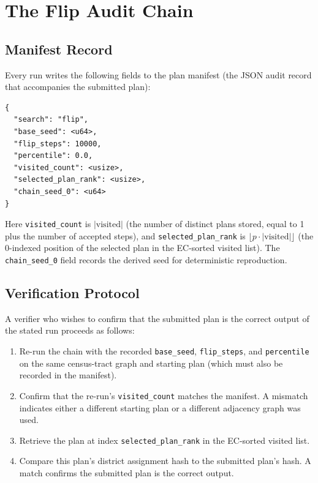 \section{The Flip Audit Chain}
\label{sec:audit}

\subsection{Manifest Record}

Every \flip{} run writes the following fields to the plan manifest (the
JSON audit record that accompanies the submitted plan):

\begin{verbatim}
{
  "search": "flip",
  "base_seed": <u64>,
  "flip_steps": 10000,
  "percentile": 0.0,
  "visited_count": <usize>,
  "selected_plan_rank": <usize>,
  "chain_seed_0": <u64>
}
\end{verbatim}

Here \texttt{visited\_count} is $|\mathrm{visited}|$ (the number of distinct
plans stored, equal to 1 plus the number of accepted steps), and
\texttt{selected\_plan\_rank} is $\lfloor p \cdot |\mathrm{visited}| \rfloor$
(the 0-indexed position of the selected plan in the EC-sorted visited list).
The \texttt{chain\_seed\_0} field records the derived seed for deterministic
reproduction.

\subsection{Verification Protocol}

A verifier who wishes to confirm that the submitted plan is the correct
output of the stated \flip{} run proceeds as follows:

\begin{enumerate}
  \item Re-run the \flip{} chain with the recorded \texttt{base\_seed},
        \texttt{flip\_steps}, and \texttt{percentile} on the same census-tract
        graph and starting plan (which must also be recorded in the manifest).
  \item Confirm that the re-run's \texttt{visited\_count} matches the manifest.
        A mismatch indicates either a different starting plan or a different
        adjacency graph was used.
  \item Retrieve the plan at index \texttt{selected\_plan\_rank} in the
        EC-sorted visited list.
  \item Compare this plan's district assignment hash to the submitted plan's
        hash.
        A match confirms the submitted plan is the correct \flip{} output.
\end{enumerate}


